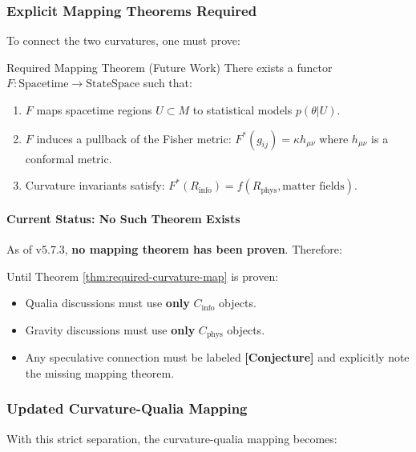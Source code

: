 \subsubsection{Explicit Mapping Theorems Required}
To connect the two curvatures, one must prove:

\begin{mytheorem}{Required Mapping Theorem (Future Work)}
\label{thm:required-curvature-map}
There exists a functor $F: \text{Spacetime} \to \text{StateSpace}$ such that:
\begin{enumerate}
\item $F$ maps spacetime regions $U \subset M$ to statistical models $p(\theta|U)$.
\item $F$ induces a pullback of the Fisher metric: $F^*(g_{ij}) = \kappa h_{\mu\nu}$ where $h_{\mu\nu}$ is a conformal metric.
\item Curvature invariants satisfy: $F^*(R_{\mathrm{info}}) = f(R_{\mathrm{phys}}, \text{matter fields})$.
\end{enumerate}
\end{mytheorem}

\paragraph{Current Status: No Such Theorem Exists}
As of v5.7.3, \textbf{no mapping theorem has been proven}. Therefore:

\begin{tcolorbox}[colback=yellow!5!white,colframe=yellow!75!black,title=Interim Protocol]
Until Theorem \ref{thm:required-curvature-map} is proven:
\begin{itemize}
\item Qualia discussions must use \textbf{only} $C_{\mathrm{info}}$ objects.
\item Gravity discussions must use \textbf{only} $C_{\mathrm{phys}}$ objects.
\item Any speculative connection must be labeled \textbf{[Conjecture]} and explicitly note the missing mapping theorem.
\end{itemize}
\end{tcolorbox}

\subsubsection{Updated Curvature-Qualia Mapping}
With this strict separation, the curvature-qualia mapping becomes:


